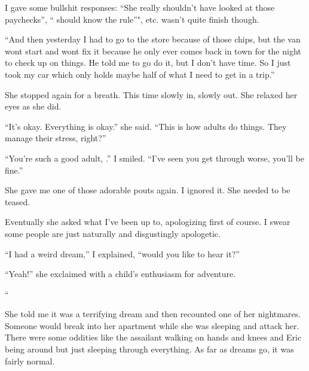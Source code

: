 \noindent
I gave some bullshit responses:
``She really shouldn't have looked at those paychecks'',
``\jasmine{} should know the rule''", etc.
\april{} wasn't quite finish though.
\VV


``And then yesterday I had to go to the store because of those chips, 
but the van wont start and \mike{} wont fix it because he only
ever comes back in town for the night to check up on things.
He told me to go do it, but I don't have time.  So I just took
my car which only holds maybe half of what I need to get in a trip.''
\VV

\noindent
She stopped again for a breath.  This time slowly in, slowly out.
She relaxed her eyes as she did.
\VV


\noindent
``It's okay. Everything is okay.'' she said.  ``This is how adults do things.
They manage their stress, right?''
\VV


``You're such a good adult, \april.''  I smiled.
``I've seen you get through worse, you'll be fine.''
\VV


\noindent
She gave me one of those adorable pouts again.  I ignored it.
She needed to be teased.
\VV


\noindent
Eventually she asked what I've been up to, apologizing first of course.
I swear some people are just naturally and disgustingly apologetic.
\VV


``I had a weird dream,'' I explained, ``would you like to hear it?''
\VV


``Yeah!'' she exclaimed with a child's enthusiasm for adventure.
\vspace*{3ex}


\begin{adjustwidth}{2em}{2em}
\noindent\Huge``\normalsize
\begin{adjustwidth}{1em}{1em}

\end{adjustwidth}
\end{adjustwidth}
\VV


\noindent
She told me it was a terrifying dream and then recounted one of
her nightmares.  Someone would break into her apartment while she
was sleeping and attack her.  There were some oddities like
the assailant walking on hands and knees and Eric being around
but just sleeping through everything.  As far as dreams go,
it was fairly normal.
